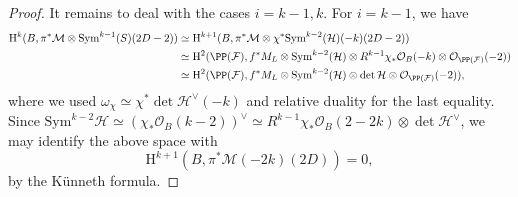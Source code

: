 \begin{proof}
It remains to deal with the cases $i=k-1,k$. For $i=k-1$, we have
{\small{
\begin{align*}
\mathrm{H}^{k}(B,\pi^*\mathcal{M} \otimes \mathrm{Sym}^{k-1}(S)(2D-2)) & \simeq \mathrm{H}^{k+1}(B,\pi^*\mathcal{M} \otimes \chi^*\mathrm{Sym}^{k-2}(\mathcal{H})(-k)(2D-2))\\
&\simeq \mathrm{H}^2(\PP(\mathcal{F}),f^*M_L \otimes \mathrm{Sym}^{k-2}(\mathcal{H})\otimes R^{k-1}\chi_*\mathcal{O}_B(-k)\otimes\mathcal{O}_{\PP(\mathcal{F})}(-2))\\
&\simeq \mathrm{H}^2(\PP(\mathcal{F}),f^*M_L \otimes \mathrm{Sym}^{k-2}(\mathcal{H})\otimes\det \mathcal{H}\otimes\mathcal{O}_{\PP(\mathcal{F})}(-2)),
\end{align*}
}}
where we used $\omega_{\chi} \simeq \chi^*\det \mathcal{H}^{\vee}(-k)$ and relative duality for the last equality. Since $\mathrm{Sym}^{k-2}\mathcal{H} \simeq (\chi_*\mathcal{O}_B(k-2))^{\vee} \simeq R^{k-1}\chi_*\mathcal{O}_B(2-2k)\otimes \det \mathcal{H}^{\vee}$, we may identify the above space with $$\mathrm{H}^{k+1}(B, \pi^*\mathcal{M}(-2k)(2D))=0,$$ by the K\"unneth formula.


\end{proof}
